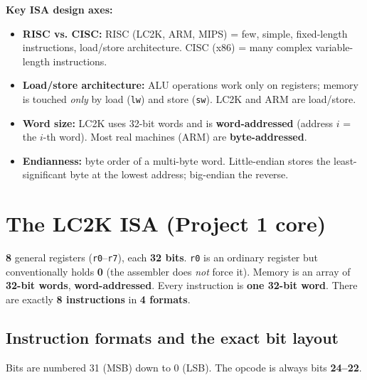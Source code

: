 \documentclass[10pt]{article}
\newcommand{\code}[1]{\texttt{\small #1}}
\begin{document}
\textbf{Key ISA design axes:}
\begin{itemize}
\item \textbf{RISC vs. CISC:} RISC (LC2K, ARM, MIPS) = few, simple, fixed-length instructions,
load/store architecture. CISC (x86) = many complex variable-length instructions.
\item \textbf{Load/store architecture:} ALU operations work only on registers; memory is touched
\emph{only} by load (\code{lw}) and store (\code{sw}). LC2K and ARM are load/store.
\item \textbf{Word size:} LC2K uses 32-bit words and is \textbf{word-addressed} (address $i$ =
the $i$-th word). Most real machines (ARM) are \textbf{byte-addressed}.
\item \textbf{Endianness:} byte order of a multi-byte word. Little-endian stores the
least-significant byte at the lowest address; big-endian the reverse.
\end{itemize}

\section{The LC2K ISA (Project 1 core)}

\begin{keybox}[LC2K at a glance]
\textbf{8} general registers (\code{r0}--\code{r7}), each \textbf{32 bits}. \code{r0} is an
ordinary register but conventionally holds \textbf{0} (the assembler does \emph{not} force it).
Memory is an array of \textbf{32-bit words}, \textbf{word-addressed}. Every instruction is
\textbf{one 32-bit word}. There are exactly \textbf{8 instructions} in \textbf{4 formats}.
\end{keybox}

\subsection{Instruction formats and the exact bit layout}
Bits are numbered 31 (MSB) down to 0 (LSB). The opcode is always bits \textbf{24--22}.

\newcommand{\bitcell}[3]{%
}
\newcommand{\field}[4]{%
  \draw[fill=#4] (#1,0) rectangle (#2,0.9);
  \node at ({(#1+#2)/2},0.45) {\strut #3};
}
\end{document}
